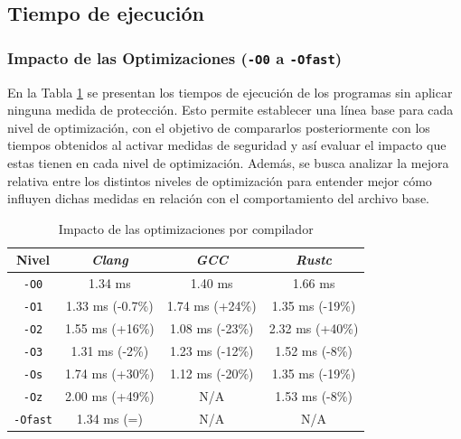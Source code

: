 \subsection{Tiempo de ejecución}

\subsubsection{Impacto de las Optimizaciones (\texttt{-O0} a \texttt{-Ofast})}
En la Tabla \ref{tab:optimizaciones_por_compilador} se presentan los tiempos de ejecución de los programas sin aplicar ninguna medida de protección. Esto permite establecer una línea base para cada nivel de optimización, con el objetivo de compararlos posteriormente con los tiempos obtenidos al activar medidas de seguridad y así evaluar el impacto que estas tienen en cada nivel de optimización. Además, se busca analizar la mejora relativa entre los distintos niveles de optimización para entender mejor cómo influyen dichas medidas en relación con el comportamiento del archivo base.


\begin{table}[H]
\centering
\footnotesize
\begin{tabular}{|c|c|c|c|}
\hline
\textbf{Nivel} & \textbf{\emph{Clang}} & \textbf{\emph{GCC}} & \textbf{\emph{Rustc}} \\
\hline
\texttt{-O0}    & 1.34 ms         & 1.40 ms        & 1.66 ms        \\
\texttt{-O1}    & 1.33 ms (-0.7\%) & 1.74 ms (+24\%) & 1.35 ms (-19\%) \\
\texttt{-O2}    & 1.55 ms (+16\%)  & 1.08 ms (-23\%) & 2.32 ms (+40\%) \\
\texttt{-O3}    & 1.31 ms (-2\%)   & 1.23 ms (-12\%) & 1.52 ms (-8\%)  \\
\texttt{-Os}    & 1.74 ms (+30\%)  & 1.12 ms (-20\%) & 1.35 ms (-19\%) \\
\texttt{-Oz}    & 2.00 ms (+49\%)  & N/A         & 1.53 ms (-8\%)  \\
\texttt{-Ofast} & 1.34 ms (=)      & N/A         & N/A          \\
\hline
\end{tabular}
\caption{Impacto de las optimizaciones por compilador}
\label{tab:optimizaciones_por_compilador}
\end{table}

